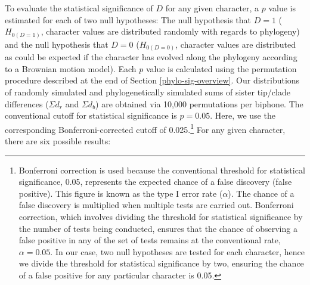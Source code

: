 To evaluate the statistical significance of \(D\) for any given character, a \(p\) value is estimated for each of two null hypotheses: The null hypothesis that \(D = 1\) (\(H_{0(D=1)}\), character values are distributed randomly with regards to phylogeny) and the null hypothesis that \(D = 0\) (\(H_{0(D=0)}\), character values are distributed as could be expected if the character has evolved along the phylogeny according to a Brownian motion model). Each \(p\) value is calculated using the permutation procedure described at the end of Section \ref{phylo-sig-overview}. Our distributions of randomly simulated and phylogenetically simulated sums of sister tip/clade differences (\(\Sigma d_r\) and \(\Sigma d_b\)) are obtained via 10,000 permutations per biphone. The conventional cutoff for statistical significance is \(p = 0.05\). Here, we use the corresponding Bonferroni-corrected cutoff of 0.025.\footnote{Bonferroni correction is used because the conventional threshold for statistical significance, 0.05, represents the expected chance of a false discovery (false positive). This figure is known as the type I error rate (\(\alpha\)). The chance of a false discovery is multiplied when multiple tests are carried out. Bonferroni correction, which involves dividing the threshold for statistical significance by the number of tests being conducted, ensures that the chance of observing a false positive in any of the set of tests remains at the conventional rate, \(\alpha = 0.05\). In our case, two null hypotheses are tested for each character, hence we divide the threshold for statistical significance by two, ensuring the chance of a false positive for any particular character is 0.05.} For any given character, there are six possible results:

